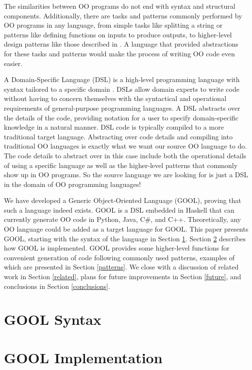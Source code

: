 \documentclass[sigplan,review,anonymous]{acmart}\settopmatter{printfolios=true,printccs=false,printacmref=false}
\begin{document}
The similarities between OO programs do not end with syntax and structural 
components. Additionally, there are tasks and patterns commonly performed by OO
programs in any language, from simple tasks like splitting a string or 
patterns like defining functions on inputs to produce outputs, to higher-level 
design patterns like those described in \cite{DesignPatterns}. A language 
that provided abstractions for these tasks and patterns would make the process 
of writing OO code even easier.

A Domain-Specific Language (DSL) is a high-level programming language with 
syntax tailored to a specific domain \cite{DSLs}. DSLs allow domain experts 
to write code without having to concern themselves with the syntactical and
operational requirements of general-purpose programming languages. A DSL
abstracts over the details of the code, providing notation for a user to
specify domain-specific knowledge in a natural manner. DSL code is typically
compiled to a more traditional target language. Abstracting over code details
and compiling into traditional OO languages is exactly what we want our source
OO language to do. The code details to abstract over in this case include both
the operational details of using a specific language as well as the higher-level
patterns that commonly show up in OO programs. So the source language we are
looking for is just a DSL in the domain of OO programming languages!

We have developed a Generic Object-Oriented Language (GOOL), proving that such 
a language indeed exists. GOOL is a DSL embedded in Haskell that can currently
generate OO code in Python, Java, C\#, and C++. Theoretically, any OO language 
could be added as a target language for GOOL. This paper presents GOOL, 
starting with the syntax of the language in Section \ref{syntax}. Section 
\ref{implementation} describes how GOOL is implemented. GOOL provides some 
higher-level functions for convenient generation of code following commonly 
used patterns, examples of which are presented in Section \ref{patterns}. We 
close with a discussion of related work in Section \ref{related}, plans for 
future improvements in Section \ref{future}, and conclusions in Section 
\ref{conclusions}.

\section{GOOL Syntax} \label{syntax}
\section{GOOL Implementation} \label{implementation}
\end{document}
